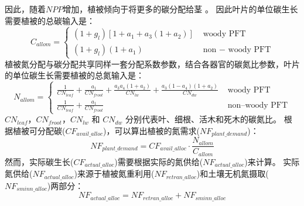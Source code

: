 因此，随着$NPP$增加，植被倾向于将更多的碳分配给茎 \citep{allen2005,vanninen2005carbon}。
因此叶片的单位碳生长需要植被的总碳输入是：
\begin{equation}\label{C_allom}
C_{ {allom }}=\left\{\begin{array}{lr}\left(1+g_{l}\right)\left[1+a_{1}+a_{3}\left(1+a_{2}\right)\right] &  \text{ woody } \text{PFT} \\ 
  \left(1+g_{l}\right)\left(1+a_{1}\right) &  \text{ non }- \text{ woody } \text{PFT}\end{array}\right.
\end{equation}
植被氮分配与碳分配共享同样一套分配系数参数，结合各器官的碳氮比参数，叶片的单位碳生长需要植被的总氮输入是：
\begin{equation}\label{N_allom}
N_{ {allom }}= \begin{cases}
\frac{1}{CN_{ {leaf }}}+\frac{a_{1}}{CN_{ {froot }}}+\frac{a_{3} a_{4}\left(1+a_{2}\right)}
  {CN_{l w}}+\frac{a_{3}\left(1-a_{4}\right)\left(1+a_{2}\right)}{CN_{d w}}  &  \text { woody PFT} \\ 
  \frac{1}{CN_{ {leaf }}}+\frac{a_{1}}{CN_{ {froot }}} & \text { non--woody PFT}
  \end{cases}
 \end{equation}
$CN_{leaf}$，$CN_{froot}$，$CN_{lw}$ 和 $CN_{dw}$ 分别代表叶、细根、活木和死木的碳氮比。
根据植被可分配碳($CF_{avail\_{alloc}}$)，可以算出植被的氮需求($NF_{plant\_{demand}}$)：
\begin{equation}
N F_{ {plant\_{demand }}}=CF_{ {avail\_{alloc }}} \cdot \frac{N_{ {allom }}}{C_{ {allom }}}
\end{equation}
然而，实际碳生长($CF_{actual\_{alloc}}$)需要根据实际的氮供给($NF_{actual\_{alloc}}$)来计算。
实际氮供给($NF_{actual\_{alloc}}$)来源于植被氮重利用($NF_{retran\_{alloc}}$)和土壤无机氮摄取($NF_{sminn\_{alloc}}$)两部分：
\begin{equation}\label{NF_actual_alloc}
NF_{actual\_{alloc}}=NF_{retran\_{alloc}}+NF_{sminn\_{alloc}}
\end{equation}



